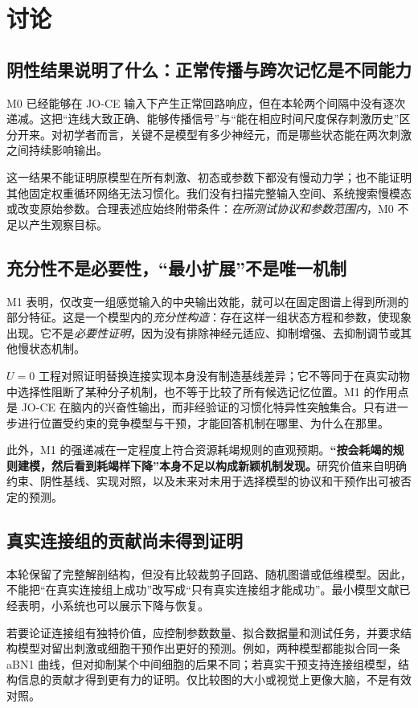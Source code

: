 \section{讨论}
\label{sec:discussion}
\subsection{阴性结果说明了什么：正常传播与跨次记忆是不同能力}
M0 已经能够在 JO-CE 输入下产生正常回路响应，但在本轮两个间隔中没有逐次递减。这把“连线大致正确、能够传播信号”与“能在相应时间尺度保存刺激历史”区分开来。对初学者而言，关键不是模型有多少神经元，而是哪些状态能在两次刺激之间持续影响输出。

这一结果不能证明原模型在所有刺激、初态或参数下都没有慢动力学；也不能证明其他固定权重循环网络无法习惯化。我们没有扫描完整输入空间、系统搜索慢模态或改变原始参数。合理表述应始终附带条件：\emph{在所测试协议和参数范围内}，M0 不足以产生观察目标。

\subsection{充分性不是必要性，“最小扩展”不是唯一机制}
M1 表明，仅改变一组感觉输入的中央输出效能，就可以在固定图谱上得到所测的部分特征。这是一个模型内的\emph{充分性构造}：存在这样一组状态方程和参数，使现象出现。它不是\emph{必要性证明}，因为没有排除神经元适应、抑制增强、去抑制调节或其他慢状态机制。

$U=0$ 工程对照证明替换连接实现本身没有制造基线差异；它不等同于在真实动物中选择性阻断了某种分子机制，也不等于比较了所有候选记忆位置。M1 的作用点是 JO-CE 在脑内的兴奋性输出，而非经验证的习惯化特异性突触集合。只有进一步进行位置受约束的竞争模型与干预，才能回答机制在哪里、为什么在那里。

此外，M1 的强递减在一定程度上符合资源耗竭规则的直观预期。\textbf{“按会耗竭的规则建模，然后看到耗竭样下降”本身不足以构成新颖机制发现。}研究价值来自明确约束、阴性基线、实现对照，以及未来对未用于选择模型的协议和干预作出可被否定的预测。

\subsection{真实连接组的贡献尚未得到证明}
本轮保留了完整解剖结构，但没有比较裁剪子回路、随机图谱或低维模型。因此，不能把“在真实连接组上成功”改写成“只有真实连接组才能成功”。最小模型文献已经表明，小系统也可以展示下降与恢复\citep{smart2024}。

若要论证连接组有独特价值，应控制参数数量、拟合数据量和测试任务，并要求结构模型对留出刺激或细胞干预作出更好的预测。例如，两种模型都能拟合同一条 aBN1 曲线，但对抑制某个中间细胞的后果不同；若真实干预支持连接组模型，结构信息的贡献才得到更有力的证明。仅比较图的大小或视觉上更像大脑，不是有效对照。

